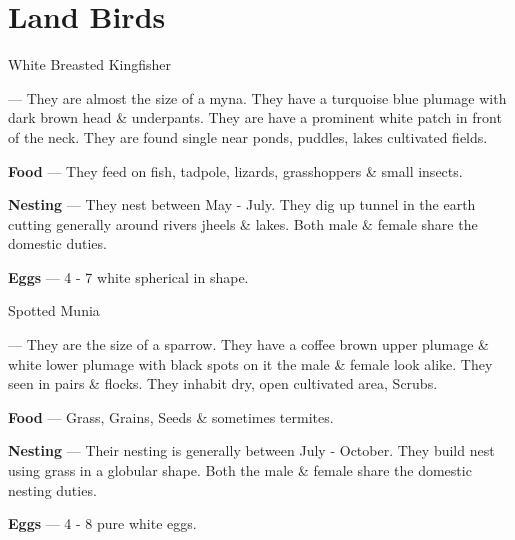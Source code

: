 \part{Land Birds}

\begin{bird}{White Breasted Kingfisher}

 --- They are almost the size of a myna. They have a turquoise blue plumage with dark brown head \& underpants. They are have a prominent white patch in front of the neck. They are found single near ponds, puddles, lakes cultivated fields.

{\large\bf Food} --- They feed on fish, tadpole, lizards, grasshoppers \& small insects.

{\large\bf Nesting} --- They nest between May - July. They dig up tunnel in the earth cutting generally around rivers jheels \& lakes. Both male \& female share the domestic duties.

{\large\bf Eggs} --- 4 - 7 white spherical in shape.
\end{bird}

\begin{bird}{Spotted Munia}

 --- They are the size of a sparrow. They have a coffee brown upper plumage \& white lower plumage with black spots on it the male \& female look alike. They seen in pairs \& flocks. They inhabit dry, open cultivated area, Scrubs. 

{\large\bf Food} --- Grass, Grains, Seeds \& sometimes termites.

{\large\bf Nesting} --- Their nesting is generally between July - October. They build nest using grass in a globular shape. Both the male \& female share the domestic nesting duties.

{\large\bf Eggs} --- 4 - 8 pure white eggs.
\end{bird}

